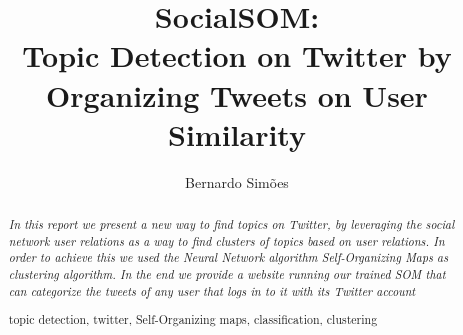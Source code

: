 \documentclass[runningheads,a4paper]{llncs}
\newcommand{\keywords}[1]{\par\addvspace\baselineskip
\noindent\keywordname\enspace\ignorespaces#1}
\begin{document}
\mainmatter  %

\title{SocialSOM: \\Topic Detection on Twitter by Organizing Tweets on User Similarity}


%
%
\author{Bernardo Simões}
%


%
%

\maketitle


\begin{abstract}

\emph{In this report we present a new way to find topics on Twitter, by leveraging the social network user relations as a way to find clusters of topics based on user relations. In order to achieve this we used the Neural Network algorithm Self-Organizing Maps as clustering algorithm. In the end we provide a website running our trained SOM that can categorize the tweets of any user that logs in to it with its Twitter account}
\keywords{topic detection, twitter, Self-Organizing maps, classification, clustering}
\end{abstract}











\end{document}
